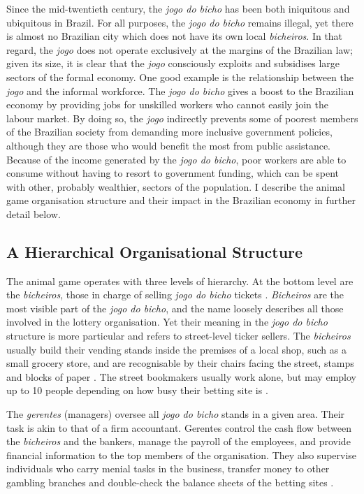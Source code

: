 \documentclass[a4paper,12pt]{article}
\begin{document}
Since the mid-twentieth century, the \textit{jogo do bicho} has been both iniquitous and ubiquitous in Brazil. For all purposes, the \textit{jogo do bicho} remains illegal, yet there is almost no Brazilian city which does not have its own local \textit{bicheiros}. In that regard, the \textit{jogo} does not operate exclusively at the margins of the Brazilian law; given its size, it is clear that the \textit{jogo} consciously exploits and subsidises large sectors of the formal economy. One good example is the relationship between the \textit{jogo} and the informal workforce. The \textit{jogo do bicho} gives a boost to the Brazilian economy by providing jobs for unskilled workers who cannot easily join the labour market. By doing so, the \textit{jogo} indirectly prevents some of poorest members of the Brazilian society from demanding more inclusive government policies, although they are those who would benefit the most from public assistance. Because of the income generated by the \textit{jogo do bicho}, poor workers are able to consume without having to resort to government funding, which can be spent with other, probably wealthier, sectors of the population. I describe the animal game organisation structure and their impact in the Brazilian economy in further detail below.  

\subsection{A Hierarchical Organisational Structure}
\label{sub:organisation}

The animal game operates with three levels of hierarchy. At the bottom level are the \textit{bicheiros}, those in charge of selling \textit{jogo do bicho} tickets \citep{chazkel2007beyond, da1999aguias}. \textit{Bicheiros} are the most visible part of the \textit{jogo do bicho}, and the name loosely describes all those involved in the lottery organisation. Yet their meaning in the \textit{jogo do bicho} structure is more particular and refers to street-level ticker sellers. The \textit{bicheiros}  usually build their vending stands inside the premises of a local shop, such as a small grocery store, and are recognisable by their chairs facing the street, stamps and blocks of paper \citep[259]{chazkel2011laws}. The street bookmakers usually work alone, but may employ up to 10 people depending on how busy their betting site is \citep[69]{labronici2014sorteio}.

The \textit{gerentes} (managers) oversee all \textit{jogo do bicho} stands in a given area. Their task is akin to that of a firm accountant. Gerentes control the cash flow between the \textit{bicheiros} and the bankers, manage the payroll of the employees, and provide financial information to the top members of the organisation. They also supervise individuals who carry menial tasks in the business, transfer money to other gambling branches and double-check the balance sheets of the betting sites \citetext{\citealp[71]{labronici2012paratodos}; \citealp[142]{misse2007illegal}}.
\end{document}
